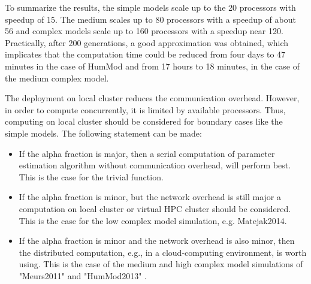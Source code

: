 To summarize the results, the simple models scale up to the 20 processors with speedup of 15. The medium scales up to 80 processors with a speedup of about 56 and complex models scale up to 160 processors with a speedup near 120. Practically, after 200 generations, a good approximation was obtained, which implicates that the computation time could be reduced from four days to 47 minutes in the case of HumMod and from 17 hours to 18 minutes, in the case of the medium complex model.

The deployment on local cluster reduces the communication overhead. However, in order to compute concurrently, it is limited by available processors. Thus, computing on local cluster should be considered for boundary cases like the simple models. The following statement can be made:
\begin{itemize}
\item{If the alpha fraction is major, then a serial computation of parameter estimation algorithm without communication overhead, will perform best. This is the case for the trivial function. }
\item{If the alpha fraction is minor, but the network overhead is still major a computation on local cluster or virtual HPC cluster should be considered. This is the case for the low complex model simulation, e.g.  Matejak2014\cite{Matejak2014sj}.} 
\item{If the alpha fraction is minor and the network overhead is also minor, then the distributed computation, e.g., in a cloud-computing environment, is worth using. This is the case of the medium and high complex model simulations of "Meurs2011" \cite{Meurs2011} and "HumMod2013" \cite{Kofranek2011hummod}.}
\end{itemize}

